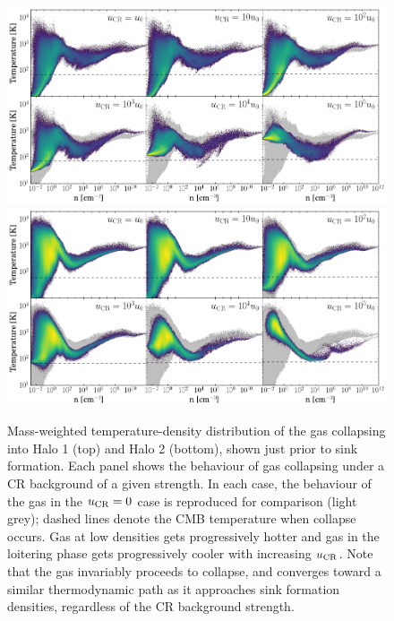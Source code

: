 \documentclass[usenatbib]{mn2e}
\newcommand{\ucr}{{u}_{\rm \small CR}}
\begin{document}
\begin{figure}
\begin{center}
\includegraphics[width=.8\textwidth]{figures/temp/temp}
\includegraphics[width=.8\textwidth]{figures/temp/temp_halo2}
\caption{\label{fig:temp}
Mass-weighted temperature-density distribution of the gas collapsing into Halo 1 (top) and Halo 2 (bottom), shown just prior to sink formation. 
Each panel shows the behaviour of gas collapsing under a CR background of a given strength. 
In each case, the behaviour of the gas in the $\ucr=0$ case is reproduced for comparison (light grey); dashed lines denote the CMB temperature when collapse occurs. Gas at low densities gets progressively hotter and gas in the loitering phase gets progressively cooler with increasing $\ucr$. 
Note that the gas invariably proceeds to collapse, and converges toward a similar thermodynamic path as it approaches sink formation densities, regardless of the CR background strength.%
}
\end{center}
\end{figure}
\end{document}
